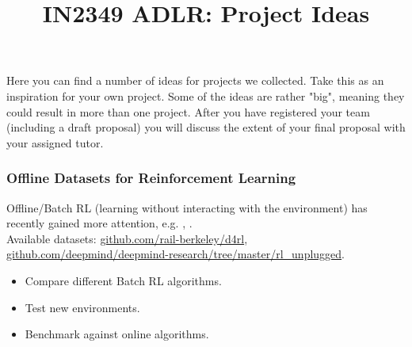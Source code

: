 \documentclass[a4paper]{article}
\title{IN2349 ADLR: Project Ideas}
\author{}
\begin{document}
\maketitle

Here you can find a number of ideas for projects we collected.
Take this as an inspiration for your own project.
Some of the ideas are rather "big", meaning they could result in more than one project.
After you have registered your team (including a draft proposal) you will discuss the extent of your final proposal with your assigned tutor.



\subsubsection{Offline Datasets for Reinforcement Learning}
Offline/Batch RL (learning without interacting with the environment) has recently gained more attention, e.g. \cite{nair2020}, \cite{AWOpt2021}. \\
Available datasets: \url{github.com/rail-berkeley/d4rl}, \url{github.com/deepmind/deepmind-research/tree/master/rl_unplugged}.
\begin{itemize}
  \item Compare different Batch RL algorithms.
  \item Test new environments.
  \item Benchmark against online algorithms.
\end{itemize}
\end{document}
